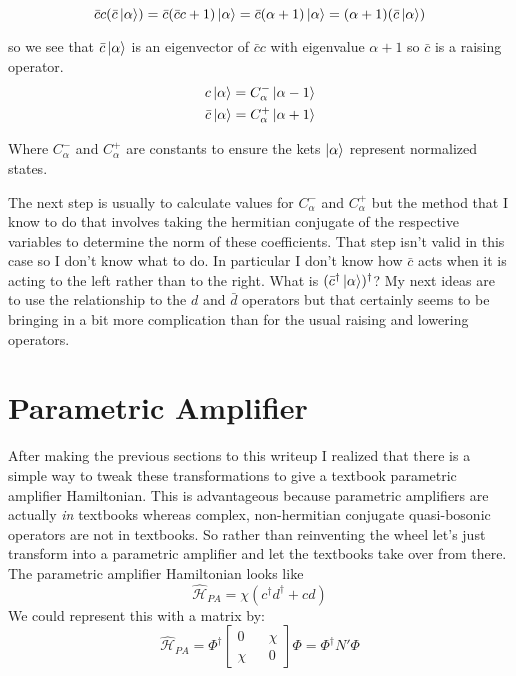 \documentclass[12pt]{article}
\begin{document}
\begin{equation}
\bar{c}c (\bar{c}\ket{\alpha}) = \bar{c}(\bar{c}c +1) \ket{\alpha} = \bar{c}(\alpha+1) \ket{\alpha} = (\alpha+1)(\bar{c}\ket{\alpha})
\end{equation}

so we see that $\bar{c}\ket{\alpha}$ is an eigenvector of $\bar{c}c$ with eigenvalue $\alpha+1$ so $\bar{c}$ is a raising operator.
\begin{align}
c\ket{\alpha} = C^-_{\alpha}\ket{\alpha-1} \\
\bar{c}\ket{\alpha} = C^+_{\alpha}\ket{\alpha+1}
\end{align}

Where $C^-_{\alpha}$ and $C^+_{\alpha}$ are constants to ensure the kets $\ket{\alpha}$ represent normalized states.

The next step is usually to calculate values for $C_{\alpha}^-$ and $C_{\alpha}^+$ but the method that I know to do that involves taking the hermitian conjugate of the respective variables to determine the norm of these coefficients. That step isn't valid in this case so I don't know what to do. In particular I don't know how $\bar{c}$ acts when it is acting to the left rather than to the right. What is $(\bar{c}^{\dag}\ket{\alpha})^{\dag}$? My next ideas are to use the relationship to the $d$ and $\bar{d}$ operators but that certainly seems to be bringing in a bit more complication than for the usual raising and lowering operators.

\section{Parametric Amplifier}
After making the previous sections to this writeup I realized that there is a simple way to tweak these transformations to give a textbook parametric amplifier Hamiltonian. This is advantageous because parametric amplifiers are actually \textit{in} textbooks whereas complex, non-hermitian conjugate quasi-bosonic operators are not in textbooks. So rather than reinventing the wheel let's just transform into a parametric amplifier and let the textbooks take over from there.
The parametric amplifier Hamiltonian looks like
\begin{equation}
\hat{\mathcal{H}}_{PA} = \chi (c^{\dag}d^{\dag} + cd)
\end{equation}
We could represent this with a matrix by:
\begin{equation}
\hat{\mathcal{H}}_{PA} = \Phi^{\dag}
\begin{bmatrix}
0 && \chi\\
\chi && 0
\end{bmatrix}
\Phi = \Phi^{\dag} N' \Phi
\end{equation}
\end{document}
